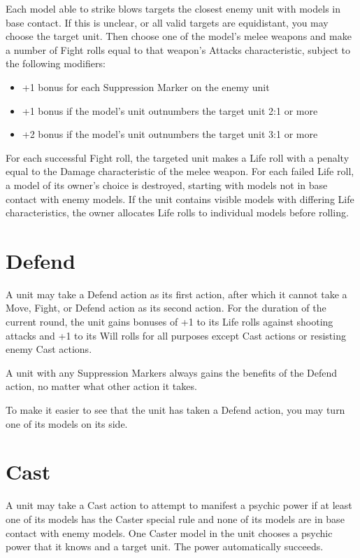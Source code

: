 \begin{multicols}{2}
Each model able to strike blows targets the closest enemy unit with models in base contact. If this is unclear, or all valid targets are equidistant, you may choose the target unit. Then choose one of the model's melee weapons and make a number of Fight rolls equal to that weapon's Attacks characteristic, subject to the following modifiers:

\begin{itemize}
 \item +1 bonus for each Suppression Marker on the enemy unit
 \item +1 bonus if the model's unit outnumbers the target unit 2:1 or more
 \item +2 bonus if the model's unit outnumbers the target unit 3:1 or more
\end{itemize}

For each successful Fight roll, the targeted unit makes a Life roll with a penalty equal to the Damage characteristic of the melee weapon. For each failed Life roll, a model of its owner's choice is destroyed, starting with models not in base contact with enemy models. If the unit contains visible models with differing Life characteristics, the owner allocates Life rolls to individual models before rolling.




\section*{Defend}
A unit may take a Defend action as its first action, after which it cannot take a Move, Fight, or Defend action as its second action. For the duration of the current round, the unit gains bonuses of +1 to its Life rolls against shooting attacks and +1 to its Will rolls for all purposes except Cast actions or resisting enemy Cast actions.

A unit with any Suppression Markers always gains the benefits of the Defend action, no matter what other action it takes.

To make it easier to see that the unit has taken a Defend action, you may turn one of its models on its side.




\section*{Cast}
A unit may take a Cast action to attempt to manifest a psychic power if at least one of its models has the Caster special rule and none of its models are in base contact with enemy models. One Caster model in the unit chooses a psychic power that it knows and a target unit. The power automatically succeeds.


\end{multicols}
